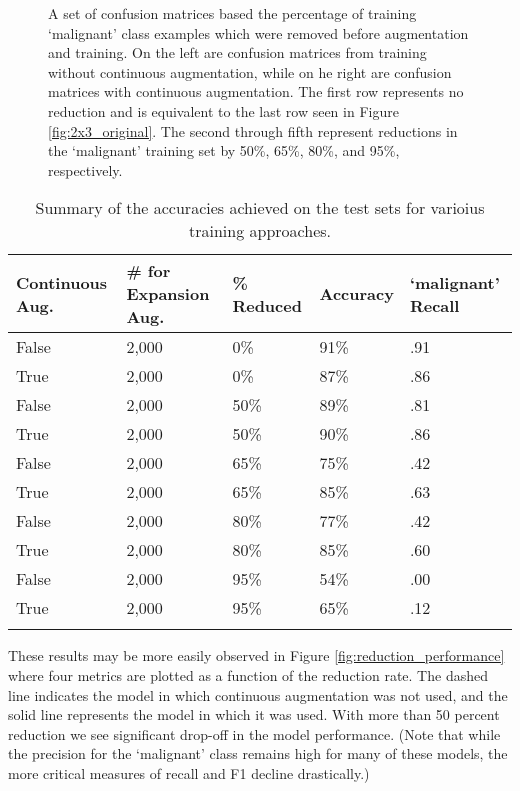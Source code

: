 \documentclass[sn-mathphys,Numbered]{sn-jnl}%
\theoremstyle{thmstyleone}%
\theoremstyle{thmstyletwo}%
\theoremstyle{thmstylethree}%
\begin{document}
\begin{figure}[!htbp]
    \centering


    \caption{A set of confusion matrices based the percentage of training `malignant' class examples which were removed before augmentation and training.  On the left are confusion matrices from training without continuous augmentation, while on he right are confusion matrices with continuous augmentation.  The first row represents no reduction and is equivalent to the last row seen in Figure \ref{fig:2x3_original}.  The second through fifth represent reductions in the `malignant' training set by 50\%, 65\%, 80\%, and 95\%, respectively.}
    \label{fig:2x5_reductions}
\end{figure}

\begin{table}[h]
\caption{Summary of the accuracies achieved on the test sets for varioius training approaches.}\label{datareductions}
\begin{tabular}{@{}lllll@{}}%
\toprule
Continuous Aug. & \# for Expansion Aug.  & \% Reduced&  Accuracy & `malignant' Recall\\
\midrule
False & 2,000 & 0\%& 91\% & .91 \\
True & 2,000 & 0\%& 87\% & .86 \\
False & 2,000 & 50\%& 89\% & .81 \\
True & 2,000 & 50\%& 90\% & .86 \\
False & 2,000 & 65\%& 75\% & .42 \\
True & 2,000 &65\%& 85\% & .63 \\
False & 2,000 & 80\%& 77\% & .42 \\
True & 2,000 & 80\%& 85\% & .60 \\
False & 2,000 & 95\%& 54\% & .00 \\
True & 2,000 &95\%& 65\% & .12 \\
\botrule
\end{tabular}
\end{table}

These results may be more easily observed in Figure \ref{fig:reduction_performance} where four metrics are plotted as a function of the reduction rate.  The dashed line indicates the model in which continuous augmentation was not used, and the solid line represents the model in which it was used.  With more than 50 percent reduction we see significant drop-off in the model performance.  (Note that while the precision for the `malignant' class remains high for many of these models, the more critical measures of recall and F1 decline drastically.) 
\end{document}
